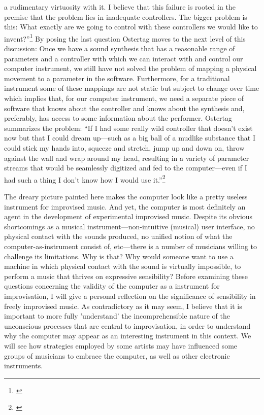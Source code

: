 a rudimentary virtuosity with it. I believe that this failure is
rooted in the premise that the problem lies in inadequate
controllers. The bigger problem is this: What exactly are we going to
control with these controllers we would like to
invent?''\footnote{\citet[p. 13]{ostertag02}} By posing the last question
Ostertag moves to the next level of this discussion: Once we have a
sound synthesis that has a reasonable range of parameters and a
controller with which we can interact with and control our computer
instrument, we still have not solved the problem of mapping a physical
movement to a parameter in the software. Furthermore, for a
traditional instrument some of these mappings are not static but
subject to change over time which implies that, for our computer
instrument, we need a separate piece of software that knows about the
controller and knows about the synthesis and, preferably, has access
to some information about the performer. Ostertag summarizes the
problem: ``If I had some really wild controller that doesn't exist now
but that I could dream up---such as a big ball of a mudlike substance
that I could stick my hands into, squeeze and stretch, jump up and
down on, throw against the wall and wrap around my head, resulting in
a variety of parameter streams that would be seamlessly digitized and
fed to the computer---even if I had such a thing I don't know how I
would use it.''\footnote{\citet[p. 14]{ostertag02}}

The dreary picture painted here makes the computer look like a pretty
useless instrument for improvised music. And yet, the computer is most
definitely an agent in the development of experimental improvised
music. Despite its obvious shortcomings as a musical
instrument---non-intuitive (musical) user interface, no physical
contact with the sounds produced, no unified notion of what the
computer-as-instrument consist of, etc---there is a number of
musicians willing to challenge its limitations. Why is that? Why would
someone want to use a machine in which physical contact with the sound
is virtually impossible, to perform a music that thrives on expressive
sensibility? Before examining these questions concerning the validity of
the computer as a instrument for improvisation, I will give a personal
reflection on the significance of sensibility in freely improvised
music. As contradictory as it may seem, I believe that it is important
to more fully 'understand' the incomprehensible nature of the
unconscious processes that are central to improvisation, in order to
understand why the computer may appear as an interesting instrument in
this context. We will see how strategies employed by some artists may
have influenced some groups of musicians to embrace the computer, as
well as other electronic instruments.

